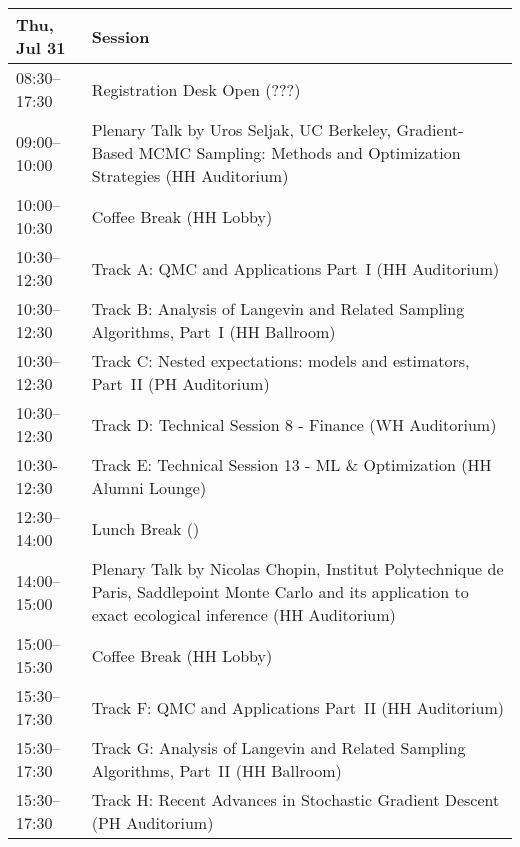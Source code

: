 \begin{table}
{\footnotesize
\begin{tabularx}{\textwidth}{>{\hsize=0.32\hsize}X|>{\hsize=1.7\hsize}X}
\hline
\textbf{Thu, Jul 31} & \textbf{Session} \\
\hline
\cellcolor{\EmptyColor}08:30–17:30 & \cellcolor{\EmptyColor}Registration Desk Open (???) \\
\cellcolor{\PlenaryColor}09:00–10:00 & \cellcolor{\PlenaryColor}Plenary Talk by Uros Seljak, UC Berkeley, Gradient-Based MCMC Sampling: Methods and Optimization Strategies (HH Auditorium) \\
\cellcolor{\EmptyColor}10:00–10:30 & \cellcolor{\EmptyColor}Coffee Break (HH Lobby) \\
\cellcolor{\SessionTitleColor}10:30–12:30 & \cellcolor{\SessionTitleColor}Track A: QMC and Applications Part~I (HH Auditorium) \\
\cellcolor{\SessionTitleColor}10:30–12:30 & \cellcolor{\SessionTitleColor}Track B: Analysis of Langevin and Related Sampling Algorithms, Part~I (HH Ballroom) \\
\cellcolor{\SessionTitleColor}10:30–12:30 & \cellcolor{\SessionTitleColor}Track C: Nested expectations: models and estimators, Part~II (PH Auditorium) \\
\cellcolor{\SessionLightColor}10:30–12:30 & \cellcolor{\SessionLightColor}Track D: Technical Session 8 - Finance (WH Auditorium) \\
\cellcolor{\SessionLightColor}10:30-12:30 & \cellcolor{\SessionLightColor}Track E: Technical Session 13 - ML \& Optimization (HH Alumni Lounge) \\
\cellcolor{\EmptyColor}12:30–14:00 & \cellcolor{\EmptyColor}Lunch Break () \\
\cellcolor{\PlenaryColor}14:00–15:00 & \cellcolor{\PlenaryColor}Plenary Talk by Nicolas Chopin, Institut Polytechnique de Paris, Saddlepoint Monte Carlo and its application to exact ecological inference (HH Auditorium) \\
\cellcolor{\EmptyColor}15:00–15:30 & \cellcolor{\EmptyColor}Coffee Break (HH Lobby) \\
\cellcolor{\SessionTitleColor}15:30–17:30 & \cellcolor{\SessionTitleColor}Track F: QMC and Applications Part~II (HH Auditorium) \\
\cellcolor{\SessionTitleColor}15:30–17:30 & \cellcolor{\SessionTitleColor}Track G: Analysis of Langevin and Related Sampling Algorithms, Part~II (HH Ballroom) \\
\cellcolor{\SessionTitleColor}15:30–17:30 & \cellcolor{\SessionTitleColor}Track H: Recent Advances in Stochastic Gradient Descent (PH Auditorium) \\

\end{tabularx}}
\end{table}
